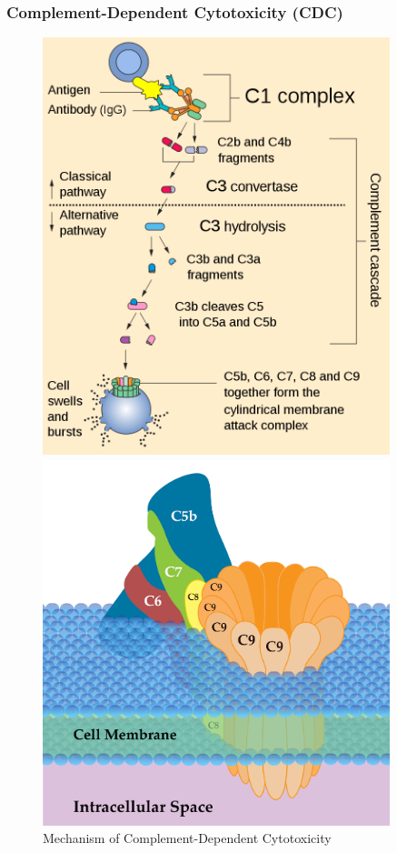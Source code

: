 \subsubsection{Complement-Dependent Cytotoxicity (CDC)}

\begin{figure}[H]
    \begin{minipage}{0.49\textwidth}
        \centering
        \includegraphics[width=0.9\textwidth]{../Images/Complement_pathway.svg.png}
        \caption{Mechanism of Complement-Dependent Cytotoxicity}
        \label{fig:CDC_pathway}
    \end{minipage}\hfill
    \begin{minipage}{0.49\textwidth}
        \centering
        \includegraphics[width=0.9\textwidth]{../Images/Membrane_Attack_Complex.png}   

\end{minipage}
\end{figure}
